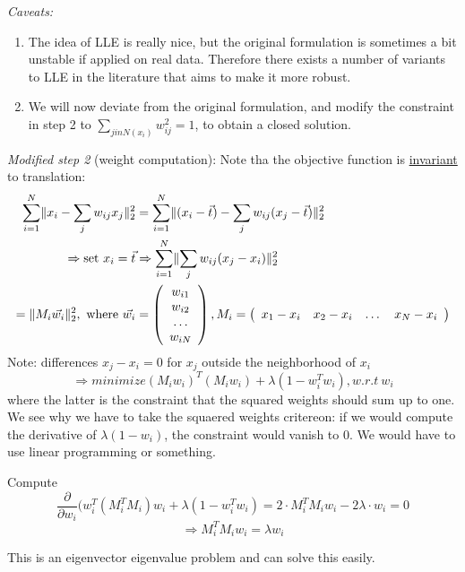 \documentclass{scrartcl}
\DeclarePairedDelimiter\norm{\lVert}{\rVert}%
\begin{document}
\textit{Caveats:} 
\begin{enumerate}
    \item
        The idea of LLE is really nice, but the original formulation is sometimes a bit unstable if applied on real data. Therefore there exists a number of variants to LLE in the literature that aims to make it more robust.
    \item
        We will now deviate from the original formulation, and modify the constraint in step 2 to \(\sum_{j in N(x_i)} w_{ij}^2 =1\), to obtain a closed solution.
\end{enumerate}

\bigbreak

\textit{Modified step 2} (weight computation): Note tha the objective function is \underline{invariant} to translation: 
\begin{align*}
    \sum_{i=1}^N \norm{x_i - \sum_j w_{ij} x_j}_2^2 &= \sum_{i=1}^N \norm{(x_i - \vec{t}) - \sum_j w_{ij} (x_j - \vec{t})}_2^2\\
    \Rightarrow \text{set } x_i = \vec{t} & \Rightarrow 
\sum_{i=1}^N \norm{\sum_j w_{ij} (x_j - x_i)}_2^2\\
    = \norm{M_i\vec{w_i}}_2^2, \text{ where } 
    \vec{w_i} &= \left( \begin{array}{c} w_{i1} \\ w_{i2} \\ \dots \\ w_{iN} \end{array} \right)
   , M_i = \left(\begin{array}{cccc} x_1 - x_i & x_2 - x_i& \dots& x_N - x_i \end{array}\right)\\
\end{align*}
Note: differences \(x_j - x_i = 0\) for \(x_j\) outside the neighborhood of \(x_i\)
\[\Rightarrow minimize (M_i w_i)^T (M_i w_i) + \lambda(1-w_i^T w_i), w.r.t \ w_i\]
where the latter is the constraint that the squared weights should sum up to one. We see why we have to take the squaered weights critereon: if we would compute the derivative of \(\lambda(1-w_i)\), the constraint would vanish to \(0\). We would have to use linear programming or something.

Compute 
\[\frac{\partial}{\partial w_i} (w_i^T (M_i^T M_i) w_i + \lambda(1-w_i^T w_i)=  2 \cdot M_i^T M_i w_i - 2 \lambda  \cdot w_i = 0\]
\[\Rightarrow M_i^T M_i w_i = \lambda w_i\]

This is an eigenvector eigenvalue problem and can solve this easily.
\end{document}
